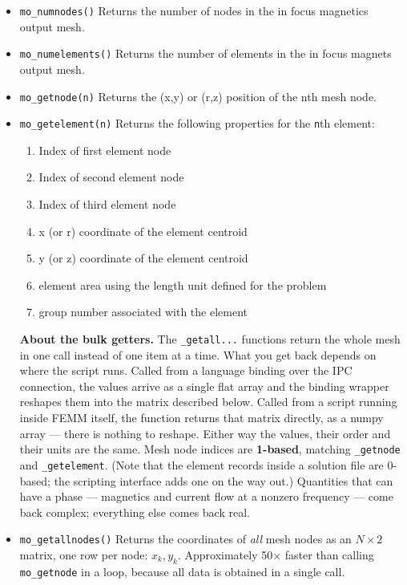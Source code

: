 \begin{itemize}
\item{\tt mo\_numnodes()} Returns the number of nodes in the in focus magnetics output mesh.
\item{\tt mo\_numelements()} Returns the number of elements in the in focus magnets output mesh.
\item{\tt mo\_getnode(n)} Returns the (x,y) or (r,z) position of the nth mesh node.
\item{\tt mo\_getelement(n)} Returns the following properties for the {\tt n}th element:
    \begin{enumerate}
        \item Index of first element node
        \item Index of second element node
        \item Index of third element node
        \item x (or r) coordinate of the element centroid
        \item y (or z) coordinate of the element centroid
        \item element area using the length unit defined for the problem
        \item group number associated with the element
    \end{enumerate}


\medskip\noindent
{\bf About the bulk getters.}  The {\tt *\_getall...} functions return the whole
mesh in one call instead of one item at a time.  What you get back depends on
where the script runs.  Called from a language binding over the IPC connection,
the values arrive as a single flat array and the binding wrapper reshapes them
into the matrix described below.  Called from a script running inside FEMM
itself, the function returns that matrix directly, as a numpy array --- there is
nothing to reshape.  Either way the values, their order and their units are the
same.  Mesh node indices are {\bf 1-based}, matching {\tt *\_getnode} and
{\tt *\_getelement}.  (Note that the element records inside a solution file are
0-based; the scripting interface adds one on the way out.)  Quantities that can
have a phase --- magnetics and current flow at a nonzero frequency --- come back
complex; everything else comes back real.
\medskip

\item{\tt mo\_getallnodes()} Returns the coordinates of {\em all} mesh
nodes as an $N \times 2$ matrix, one row per node: $x_k, y_k$.  Approximately
50$\times$ faster than calling {\tt mo\_getnode} in a loop, because all data
is obtained in a single call.


\end{itemize}
